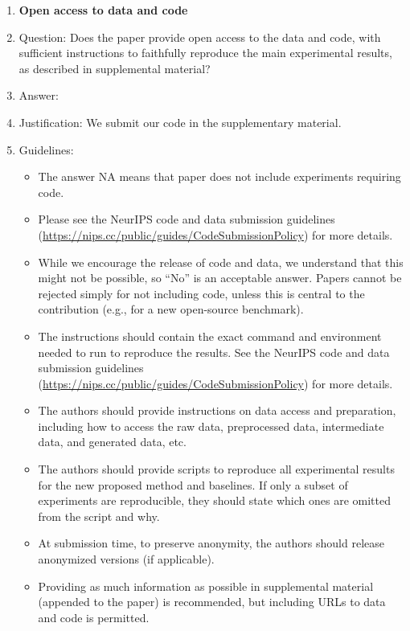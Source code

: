 \documentclass{article}
\begin{document}
\begin{enumerate}
\item {\bf Open access to data and code}
    \item[] Question: Does the paper provide open access to the data and code, with sufficient instructions to faithfully reproduce the main experimental results, as described in supplemental material?
    \item[] Answer: \answerYes{} %
    \item[] Justification: We submit our code in the supplementary material.
    \item[] Guidelines:
    \begin{itemize}
        \item The answer NA means that paper does not include experiments requiring code.
        \item Please see the NeurIPS code and data submission guidelines (\url{https://nips.cc/public/guides/CodeSubmissionPolicy}) for more details.
        \item While we encourage the release of code and data, we understand that this might not be possible, so “No” is an acceptable answer. Papers cannot be rejected simply for not including code, unless this is central to the contribution (e.g., for a new open-source benchmark).
        \item The instructions should contain the exact command and environment needed to run to reproduce the results. See the NeurIPS code and data submission guidelines (\url{https://nips.cc/public/guides/CodeSubmissionPolicy}) for more details.
        \item The authors should provide instructions on data access and preparation, including how to access the raw data, preprocessed data, intermediate data, and generated data, etc.
        \item The authors should provide scripts to reproduce all experimental results for the new proposed method and baselines. If only a subset of experiments are reproducible, they should state which ones are omitted from the script and why.
        \item At submission time, to preserve anonymity, the authors should release anonymized versions (if applicable).
        \item Providing as much information as possible in supplemental material (appended to the paper) is recommended, but including URLs to data and code is permitted.
    \end{itemize}



\end{enumerate}
\end{document}
